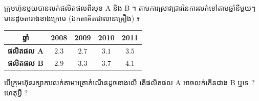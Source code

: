 \documentclass[theme=teal]{khmermath}
\def\splitnum#1#2{%
  \color{koreaNumber!65}#1\color{koreaOrange}#2%
}
\newcommand{\koreannum}[1]{%
  \ifstrempty{#1}{}{%
    \mbox{%
      \fontsize{20}{20}\selectfont\bfseries%
      \ifnum#1<10\relax%
        \color{koreaNumber!65}0\color{koreaOrange}#1%
      \else%
        \expandafter\splitnum#1%
      \fi%
    }\,\ %
  }%
}
\newcommand{\exhead}[1]{\hangindent=24pt\hangafter=1\koreannum{#1}}
\begin{document}
\vspace{3pt}
\Needspace*{4.5cm}
\exhead{24} ក្រុមហ៊ុនមួយបានលក់ផលិតផលពីរមុខ A និង B ។ តាមការស្រាវជ្រាវនៃការលក់ទៅតាមឆ្នាំនីមួយៗមានដូចតារាងខាងក្រោម (ឯកតាគិតជាលានគ្រឿង) ៖
\begin{center}
  \renewcommand{\arraystretch}{1.2}
  \begin{tabular}{|c|c|c|c|c|}
    \hline
    \rowcolor{brandNavy!15} \textbf{ឆ្នាំ} & \textbf{2008} & \textbf{2009} & \textbf{2010} & \textbf{2011} \\ \hline
    \textbf{ផលិតផល A} & $2.3$ & $2.7$ & $3.1$ & $3.5$ \\ \hline
    \textbf{ផលិតផល B} & $2.9$ & $3.3$ & $3.7$ & $4.1$ \\ \hline
  \end{tabular}
\end{center}
បើក្រុមហ៊ុនរក្សាការលក់តាមអត្រាកំណើនដូចខាងលើ តើផលិតផល A អាចលក់កើនជាង B ឬទេ ? ហេតុអ្វី ?
\end{document}
